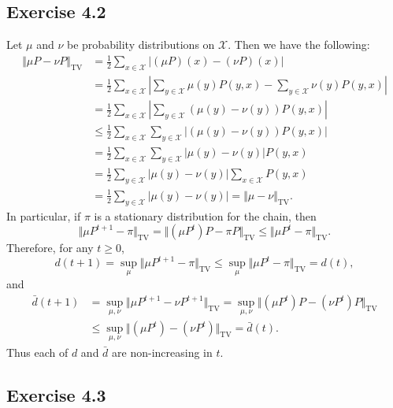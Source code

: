 \documentclass[12pt]{article}
\begin{document}
\subsection*{Exercise 4.2}

Let $\mu$ and $\nu$ be probability distributions on $\mathcal{X}$. Then we have the following:
\begin{align*}
\Vert \mu P - \nu P \Vert_\mathrm{TV} &= \frac{1}{2} \sum_{x \in \mathcal{X}} \left| (\mu P)(x) - (\nu P)(x) \right| \\
&= \frac{1}{2} \sum_{x \in \mathcal{X}} \left| \sum_{y \in \mathcal{X}} \mu(y) P(y, x) - \sum_{y \in \mathcal{X}} \nu(y) P(y, x) \right| \\
&= \frac{1}{2} \sum_{x \in \mathcal{X}} \left| \sum_{y \in \mathcal{X}} (\mu(y) - \nu(y)) P(y, x) \right| \\
&\leq \frac{1}{2} \sum_{x \in \mathcal{X}} \sum_{y \in \mathcal{X}} \left| (\mu(y) - \nu(y)) P(y, x) \right| \\
&= \frac{1}{2} \sum_{x \in \mathcal{X}} \sum_{y \in \mathcal{X}} \left|\mu(y) - \nu(y) \right| P(y, x) \\
&= \frac{1}{2} \sum_{y \in \mathcal{X}} \left|\mu(y) - \nu(y) \right| \sum_{x \in \mathcal{X}} P(y, x) \\
&= \frac{1}{2} \sum_{y \in \mathcal{X}} \left|\mu(y) - \nu(y) \right| = \Vert \mu - \nu \Vert_\mathrm{TV}.
\end{align*}
In particular, if $\pi$ is a stationary distribution for the chain, then
\begin{equation*}
\Vert \mu P^{t+1} - \pi \Vert_\mathrm{TV} = \Vert (\mu P^t)P - \pi P \Vert_\mathrm{TV} \leq \Vert \mu P^t - \pi \Vert_\mathrm{TV}.
\end{equation*}
Therefore, for any $t \geq 0$,
\begin{equation*}
d(t+1) = \sup_\mu \Vert \mu P^{t+1} - \pi \Vert_\mathrm{TV} \leq \sup_\mu \Vert \mu P^t - \pi \Vert_\mathrm{TV} = d(t),
\end{equation*}
and
\begin{align*}
\bar{d}(t+1) &= \sup_{\mu, \nu} \Vert \mu P^{t+1} - \nu P^{t+1} \Vert_\mathrm{TV} = \sup_{\mu, \nu} \Vert (\mu P^t)P - (\nu P^t)P \Vert_\mathrm{TV} \\
&\leq \sup_{\mu, \nu} \Vert (\mu P^t) - (\nu P^t) \Vert_\mathrm{TV} = \bar{d}(t).
\end{align*}
Thus each of $d$ and $\bar{d}$ are non-increasing in $t$.

\subsection*{Exercise 4.3}
\end{document}
